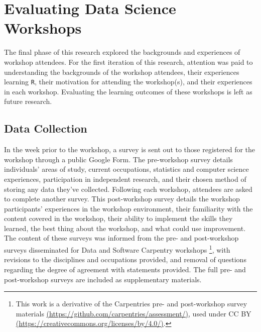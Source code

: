 \documentclass[12pt]{article}
\begin{document}
\section{Evaluating Data Science Workshops}
\label{sec:implement}

\quad The final phase of this research explored the backgrounds and experiences of workshop attendees. For the first iteration of this research, attention was paid to understanding the backgrounds of the workshop attendees, their experiences learning \texttt{R}, their motivation for attending the workshop(s), and their experiences in each workshop. Evaluating the learning outcomes of these workshops is left as future research.  
\subsection{Data Collection}

\quad  In the week prior to the workshop, a survey is sent out to those registered for the workshop through a public Google Form. The pre-workshop survey details individuals' areas of study, current occupations, statistics and computer science experiences, participation in independent research, and their chosen method of storing any data they've collected. Following each workshop, attendees are asked to complete another survey. This post-workshop survey details the workshop participants' experiences in the workshop environment, their familiarity with the content covered in the workshop, their ability to implement the skills they learned, the best thing about the workshop, and what could use improvement. The content of these surveys was informed from the pre- and post-workshop surveys disseminated for Data and Software Carpentry workshops \footnote{This work is a derivative of the Carpentries pre- and post-workshop survey materials \href{https://github.com/carpentries/assessment/}{(https://github.com/carpentries/assessment/)}, used under CC BY \href{https://creativecommons.org/licenses/by/4.0/}{(https://creativecommons.org/licenses/by/4.0/)}.}, with revisions to the disciplines and occupations provided, and removal of questions regarding the degree of agreement with statements provided. The full pre- and post-workshop surveys are included as supplementary materials.
\end{document}
